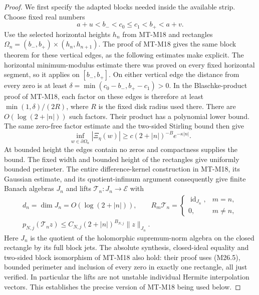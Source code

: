 \begin{proof}
We first specify the adapted blocks needed inside the available
strip. Choose fixed real numbers
\[
        a+u<b_-<c_0\le c_1<b_+<a+v.
\]
Use the selected horizontal heights $h_n$ from MT-M18 and
rectangles $\Omega_n=(b_-,b_+)\times(h_n,h_{n+1})$.
The proof of MT-M18 gives the same block theorem for these
vertical edges, as the following estimates make explicit.
The horizontal minimum-modulus estimate there was proved
on every fixed horizontal segment, so it applies on
$[b_-,b_+]$. On either vertical edge the distance from every
zero is at least
$\delta=\min(c_0-b_-,b_+-c_1)>0$.
In the Blaschke-product proof of MT-M18, each factor on these
edges is therefore at least
$\min(1,\delta)/(2R)$, where $R$ is the fixed disk radius
used there. There are $O(\log(2+|n|))$ such factors.
Their product has a polynomial lower bound. The same
zero-free factor estimate and the two-sided Stirling bound
then give
\[
 \inf_{w\in\partial\Omega_n}|\Xi_\eta(w)|
    \ge c(2+|n|)^{-B}e^{-\kappa|n|}.
                                                               \tag{M26.5}
\]
At bounded height the edges contain no zeros and compactness
supplies the bound. The fixed width and bounded height of the
rectangles give uniformly bounded perimeter. The entire
difference-kernel construction in MT-M18, its Gaussian estimate,
and its quotient-infimum argument consequently give finite
Banach algebras $J_n$ and lifts $\mathcal T_n:J_n\to\mathcal E$
with
\[
 \begin{gathered}
 d_n=\dim J_n=O(\log(2+|n|)),\qquad
 R_m\mathcal T_n=\begin{cases}\operatorname{id}_{J_n},&m=n,\\0,&m\ne n,
                         \end{cases}\\
 p_{N,j}(\mathcal T_n z)
       \le C_{N,j}(2+|n|)^{B_{N,j}}\|z\|_{J_n}.
 \end{gathered}                                                 \tag{M26.6}
\]
Here $J_n$ is the quotient of the holomorphic supremum-norm
algebra on the closed rectangle by its full block jets.
The absolute synthesis, closed-ideal equality and two-sided
block isomorphism of MT-M18 also hold: their proof uses
(M26.5), bounded perimeter and inclusion of every zero in
exactly one rectangle, all just verified. In particular the
lifts are not unstable individual Hermite interpolation
vectors. This establishes the precise version of MT-M18
being used below.


\end{proof}
